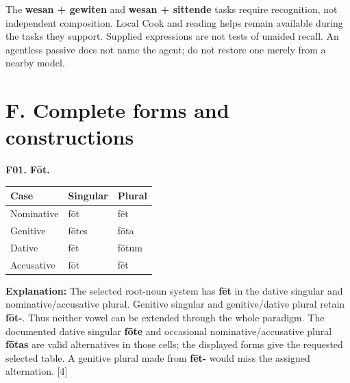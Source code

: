 The \textbf{wesan + gewiten} and \textbf{wesan + sittende} tasks require recognition, not independent composition. Local Cook and reading helps remain available during the tasks they support. Supplied expressions are not tests of unaided recall. An agentless passive does not name the agent; do not restore one merely from a nearby model.

\clearpage
\section*{F. Complete forms and constructions}

\par\begin{minipage}{\linewidth}\raggedright
\textbf{F01. Fōt.}

\par\begingroup
\fontsize{10.5}{13.2}\selectfont
\setlength{\LTleft}{0pt}\setlength{\LTright}{\fill}
\noindent
\begin{tabular}{@{}>{\raggedright\arraybackslash}p{39.46mm}>{\raggedright\arraybackslash}p{39.46mm}>{\raggedright\arraybackslash}p{39.46mm}@{}}
\toprule
\textbf{Case} & \textbf{Singular} & \textbf{Plural} \\
\midrule
Nominative & fōt & fēt \\
Genitive & fōtes & fōta \\
Dative & fēt & fōtum \\
Accusative & fōt & fēt \\
\bottomrule
\end{tabular}
\par\endgroup

\textbf{Explanation:} The selected root-noun system has \textbf{fēt} in the dative singular and nominative/\allowbreak{}accusative plural. Genitive singular and genitive/\allowbreak{}dative plural retain \textbf{fōt-}. Thus neither vowel can be extended through the whole paradigm. The documented dative singular \textbf{fōte} and occasional nominative/\allowbreak{}accusative plural \textbf{fōtas} are valid alternatives in those cells; the displayed forms give the requested selected table. A genitive plural made from \textbf{fēt-} would miss the assigned alternation. [4]

\end{minipage}\par\addvspace{4pt}

